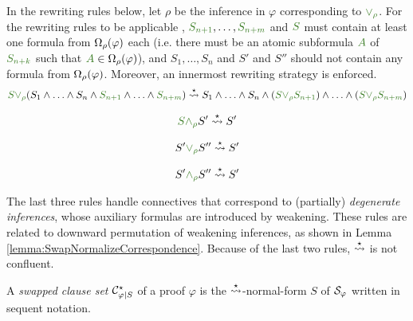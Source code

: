 \begin{definition}[$\normalizePlusTimesS$]
\label{definition:NormalizationPlusTimesSwap}
In the rewriting rules below, let $\rho$ be the inference in $\varphi$ corresponding to $\hF{\structtimes_{\rho}}$. For the rewriting rules to be applicable
%
%
, $\hF{S_{n+1}}, \ldots, \hF{S_{n+m}}$ and $\hF{S}$ must contain at least one formula from $\Omega_{\rho}(\varphi)$ each (i.e. there must be an atomic subformula $\hF{A}$ of $\hF{S_{n+k}}$ such that $\hF{A} \in \occInference{\varphi}{\rho}$), and $S_1, \ldots, S_n$ and $S'$ and $S''$ should not contain any formula from $\Omega_{\rho}(\varphi)$. Moreover, an innermost rewriting strategy is enforced.
$$
\hF{S} \hF{\structtimes_{\rho}} (S_1 \structplus \ldots \structplus S_n \structplus \hF{S_{n+1}} \structplus \ldots \structplus \hF{S_{n+m}}) \normalizePlusTimesS  S_1 \structplus \ldots \structplus S_n \structplus (\hF{S} \hF{\structtimes_{\rho}} \hF{S_{n+1}}) \structplus \ldots \structplus (\hF{S} \hF{\structtimes_{\rho}} \hF{S_{n+m}}) 
$$
\begin{multicols}{3}{
$$
\hF{S} \hF{\structplus_{\rho}} S' \normalizePlusTimesS  S'
$$

$$
S' \hF{\structtimes_{\rho}} S'' \normalizePlusTimesS  S'
$$

$$
S' \hF{\structplus_{\rho}} S'' \normalizePlusTimesS  S'
$$
}\end{multicols}

\end{definition}

\begin{remark}
The last three rules handle connectives that correspond to (partially) \emph{degenerate inferences}, whose auxiliary formulas are introduced by weakening. These rules are related to downward permutation of weakening inferences, as shown in Lemma \ref{lemma:SwapNormalizeCorrespondence}. Because of the last two rules, $\normalizePlusTimesS$ is not confluent.
\end{remark}


\begin{definition}
\label{definition:CutPertinentClauseSetSwap}
A \emph{swapped clause set} $\mathcal{C}^{\star}_{\varphi|S}$ of a proof $\varphi$ is the $\normalizePlusTimesS$-normal-form $S$ of $\mathcal{S}_{\varphi}$ written in sequent notation.
\end{definition}

